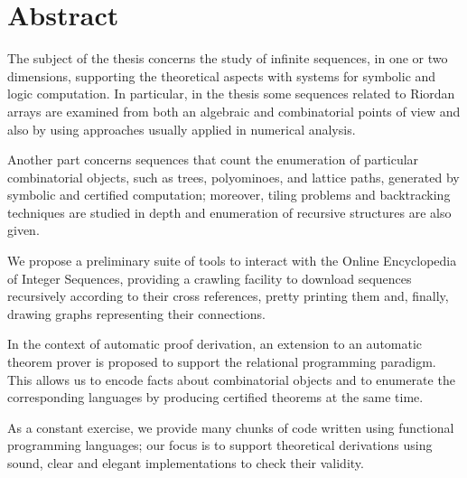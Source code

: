 \documentclass[a4paper,10pt]{tufte-book}
\begin{document}
\fontsize{12pt}{15pt}\selectfont

\blankpage



\blankpage



\cleardoublepage



\cleardoublepage

\chapter*{Abstract}

The subject of the thesis concerns the study of infinite sequences, in one or
two dimensions, supporting the theoretical aspects with systems for symbolic
and logic computation. In particular, in the thesis some sequences related to
Riordan arrays are examined from both an algebraic and combinatorial points of
view and also by using approaches usually applied in numerical analysis.

Another part concerns sequences that count the enumeration of particular
combinatorial objects, such as trees, polyominoes, and lattice paths,
generated by symbolic and certified computation; moreover, tiling problems
and backtracking techniques are studied in depth and enumeration of recursive
structures are also given.

We propose a preliminary suite of tools to interact with the Online
Encyclopedia of Integer Sequences, providing a crawling facility to download
sequences recursively according to their cross references, pretty printing them
and, finally, drawing graphs representing their connections.

In the context of automatic proof derivation, an extension to an automatic
theorem prover is proposed to support the relational programming paradigm.
This allows us to encode facts about combinatorial objects and to enumerate the
corresponding languages by producing certified theorems at the same time.

As a constant exercise, we provide many chunks of code written using functional
programming languages; our focus is to support theoretical derivations using
sound, clear and elegant implementations to check their validity.

\tableofcontents

\listoftables


\end{document}
